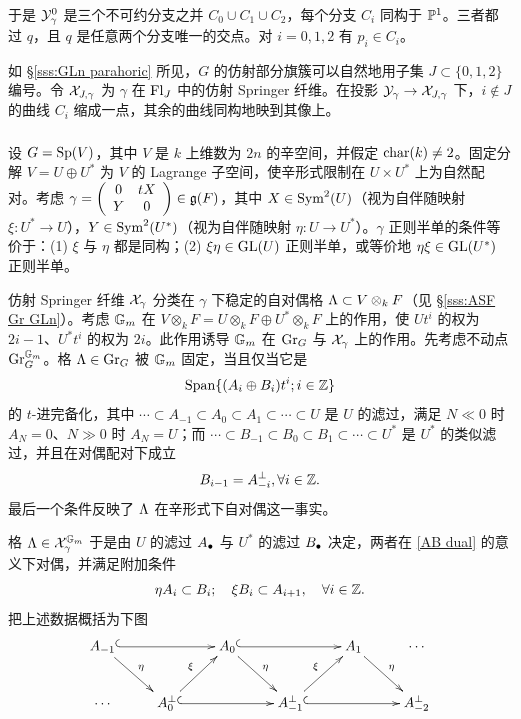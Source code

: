 于是 $\mathcal{Y}^{0}_{\gamma}$ 是三个不可约分支之并 $C_{0}\cup C_{1}\cup C_{2}$，每个分支 $C_{i}$ 同构于 $\mathbb{P}^{1}$。三者都过 $q$，且 $q$ 是任意两个分支唯一的交点。对 $i=0,1,2$ 有 $p_{i}\in C_{i}$。

如 \S\ref{sss:GLn parahoric} 所见，$G$ 的仿射部分旗簇可以自然地用子集 $J\subset \{0,1,2\}$ 编号。令 $\mathcal{X}_{J,\gamma}$ 为 $\gamma$ 在 $\textup{Fl}_{J}$ 中的仿射 Springer 纤维。在投影 $\mathcal{Y}_{\gamma}\to \mathcal{X}_{J,\gamma}$ 下，$i\notin J$ 的曲线 $C_{i}$ 缩成一点，其余的曲线同构地映到其像上。

\subsubsection{}\label{ex:Sp} 设 $G=\textup{Sp}(V)$，其中 $V$ 是 $k$ 上维数为 $2n$ 的辛空间，并假定 $\textup{char}(k)\neq2$。固定分解 $V=U\oplus U^{*}$ 为 $V$ 的 Lagrange 子空间，使辛形式限制在 $U\times U^{*}$ 上为自然配对。考虑 $\gamma=\left(\begin{array}{cc} 0 & tX \\ Y & 0 \end{array}\right)\in\mathfrak{g}(F)$，其中 $X\in\textup{Sym}^{2}(U)$（视为自伴随映射 $\xi:U^{*}\to U$），$Y\in\textup{Sym}^{2}(U^{*})$（视为自伴随映射 $\eta:U\to U^{*}$）。$\gamma$ 正则半单的条件等价于：(1) $\xi$ 与 $\eta$ 都是同构；(2) $\xi\eta\in\textup{GL}(U)$ 正则半单，或等价地 $\eta\xi\in\textup{GL}(U^{*})$ 正则半单。

仿射 Springer 纤维 $\mathcal{X}_{\gamma}$ 分类在 $\gamma$ 下稳定的自对偶格 $\Lambda\subset V\otimes_{k}F$（见 \S\ref{sss:ASF Gr GLn}）。考虑 $\mathbb{G}_m$ 在 $V\otimes_{k}F=U\otimes_{k}F\oplus U^{*}\otimes_{k}F$ 上的作用，使 $Ut^{i}$ 的权为 $2i-1$、$U^{*}t^{i}$ 的权为 $2i$。此作用诱导 $\mathbb{G}_m$ 在 $\textup{Gr}_{G}$ 与 $\mathcal{X}_{\gamma}$ 上的作用。先考虑不动点 $\textup{Gr}_{G}^{\mathbb{G}_m}$。格 $\Lambda\in\textup{Gr}_{G}$ 被 $\mathbb{G}_m$ 固定，当且仅当它是
\begin{equation*}
\textup{Span}\{(A_{i}\oplus B_{i})t^{i}; i\in\mathbb{Z} \}
\end{equation*}
的 $t$-进完备化，其中 $\cdots \subset A_{-1}\subset A_{0}\subset A_{1}\subset \cdots \subset U$ 是 $U$ 的滤过，满足 $N\ll 0$ 时 $A_{N}=0$、$N\gg 0$ 时 $A_{N}=U$；而 $\cdots \subset B_{-1}\subset B_{0}\subset B_{1}\subset \cdots \subset U^{*}$ 是 $U^{*}$ 的类似滤过，并且在对偶配对下成立
\begin{equation}\label{AB dual}
B_{i-1}=A^{\bot}_{-i}, \forall i\in\mathbb{Z}.
\end{equation}
最后一个条件反映了 $\Lambda$ 在辛形式下自对偶这一事实。

格 $\Lambda\in\mathcal{X}_{\gamma}^{\mathbb{G}_m}$ 于是由 $U$ 的滤过 $A_{\bullet}$ 与 $U^{*}$ 的滤过 $B_{\bullet}$ 决定，两者在 \eqref{AB dual} 的意义下对偶，并满足附加条件
\begin{equation*}
\eta A_{i}\subset B_{i}; \quad \xi B_{i}\subset A_{i+1}, \quad\forall i\in\mathbb{Z}.
\end{equation*}
把上述数据概括为下图
\begin{equation*}
\xymatrix{ A_{-1}\ar@{^{(}->}[rr]\ar[dr]^{\eta} && A_{0}\ar@{^{(}->}[rr]\ar[dr]^{\eta} && A_{1}\ar[dr]^{\eta}& \cdots\\
\cdots & A^{\bot}_{0}\ar@{^{(}->}[rr]\ar[ur]^{\xi} && A^{\bot}_{-1}\ar@{^{(}->}[rr]\ar[ur]^{\xi} && A_{-2}^{\bot}}
\end{equation*}

